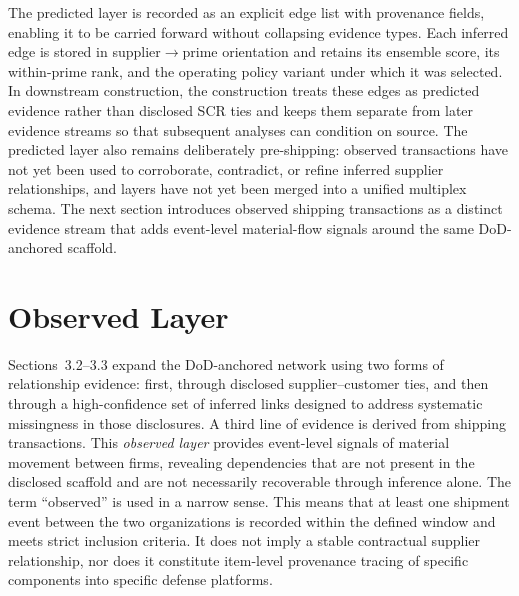 The predicted layer is recorded as an explicit edge list with provenance fields, enabling it to be carried forward without collapsing evidence types. Each inferred edge is stored in supplier$\rightarrow$prime orientation and retains its ensemble score, its within-prime rank, and the operating policy variant under which it was selected. In downstream construction, the construction treats these edges as predicted evidence rather than disclosed SCR ties and keeps them separate from later evidence streams so that subsequent analyses can condition on source. The predicted layer also remains deliberately pre-shipping: observed transactions have not yet been used to corroborate, contradict, or refine inferred supplier relationships, and layers have not yet been merged into a unified multiplex schema. The next section introduces observed shipping transactions as a distinct evidence stream that adds event-level material-flow signals around the same DoD-anchored scaffold.

\section{Observed Layer}

Sections~3.2--3.3 expand the DoD-anchored network using two forms of relationship evidence: first, through disclosed supplier--customer ties, and then through a high-confidence set of inferred links designed to address systematic missingness in those disclosures. A third line of evidence is derived from shipping transactions. This \emph{observed layer} provides event-level signals of material movement between firms, revealing dependencies that are not present in the disclosed scaffold and are not necessarily recoverable through inference alone. The term ``observed'' is used in a narrow sense. This means that at least one shipment event between the two organizations is recorded within the defined window and meets strict inclusion criteria. It does not imply a stable contractual supplier relationship, nor does it constitute item-level provenance tracing of specific components into specific defense platforms.

